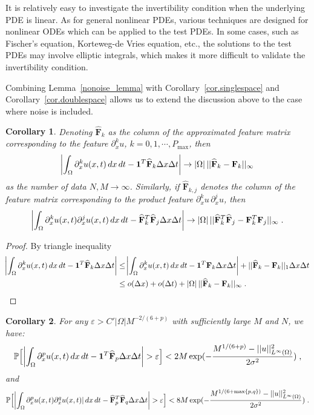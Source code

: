 \documentclass[a4paper,11pt]{article}
\newcommand{\bF}{\mathbf{F}}
\newtheorem{corollary}{Corollary}[section]
\begin{document}
It is relatively easy to investigate the invertibility condition when the underlying PDE is linear. As for general nonlinear PDEs, various techniques are designed for nonlinear ODEs which can be applied to the test PDEs. In some cases, such as Fischer's equation, Korteweg-de Vries equation, etc., the solutions to the test PDEs may involve elliptic integrals, which makes it more difficult to validate the invertibility condition. 

Combining Lemma~\ref{nonoise_lemma} with Corollary~\ref{cor.singlespace} and Corollary~\ref{cor.doublespace} allows us to extend the discussion above to the case where noise is included.
\begin{corollary}
Denoting $\widehat{\bF}_k$ as the column of the approximated feature matrix corresponding to the feature $\partial_x^k u$, $k=0,1,\cdots,P_{\max}$, then
\begin{align}
	\abs{\int_\Omega\partial_x^ku(x,t)\,dx\,dt-\mathbf{1}^T\widehat{\bF}_k\Delta x\Delta t}\to |\Omega|\,||\widehat{\bF}_k-\bF_k||_\infty
\end{align}
as the number of data $N,M\to\infty$. Similarly, if $\widehat{\bF}_{k,j}$ denotes the column of the feature matrix corresponding to the product feature $\partial_x^ku\,\partial_x^ju$, then
\begin{align}
	\abs{\int_\Omega\partial_x^ku(x,t)\partial_x^ju(x,t)\,dx\,dt-\widehat{\bF}_{k}^T\widehat{\bF}_{j}\Delta x\Delta t}\to |\Omega|\,||\widehat{\bF}^T_{k}\widehat{\bF}_{j}-\bF^T_{k}\bF_{j}||_\infty\;.
\end{align}

\end{corollary}
\begin{proof} By triangle inequality
\begin{align*}
	\abs{\int_\Omega \partial_x^ku(x,t)\,dx\,dt-\mathbf{1}^T\widehat{\bF}_k\Delta x\Delta t}&\leq \abs{\int_\Omega\partial_x^ku(x,t)\,dx\,dt-\mathbf{1}^T\bF_k\Delta x\Delta t}+||\widehat{\bF}_k-\bF_k||_1\Delta x\Delta t\\
	&\leq o(\Delta x) + o(\Delta t)+|\Omega|\,||\widehat{\bF}_k-\bF_k||_\infty\;.
\end{align*}
\end{proof}
\begin{corollary}
For any $\varepsilon >C'|\Omega|M^{-2/(6+p)}$ with sufficiently large $M$ and $N$, we have:
\begin{align}
\mathbb{P}\Big[\abs{\int_\Omega\partial_x^pu(x,t)\,dx\,dt-\mathbf{1}^T\widehat{\bF}_p\Delta x\Delta t}>\varepsilon\Big]<2M\exp(-\frac{M^{1/(6+p)}-||u||_{L^\infty(\Omega)}^2}{2\sigma^2})\;,
\end{align}
and
\begin{align}
\mathbb{P}\Big[\abs{\int_\Omega\partial_x^pu(x,t)\partial_x^qu(x,t)|\,dx\,dt-\widehat{\bF}^T_p\widehat{\bF}_q\Delta x\Delta t}>\varepsilon\Big]<8M\exp(-\frac{M^{1/(6+\max\{p,q\})}-||u||_{L^\infty(\Omega)}^2}{2\sigma^2})\;.
\end{align}
\end{corollary}
\end{document}
